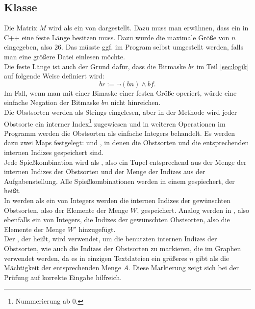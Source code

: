 \subsection{Klasse }
Die Matrix $M$ wird als ein  von  dargestellt.
Dazu muss man erwähnen, dass ein  in C++ eine feste Länge besitzen muss.
Dazu wurde die maximale Größe von $n$ eingegeben, also 26.
Das müsste ggf. im Program selbst umgestellt werden,
falls man eine größere Datei einlesen möchte.\\
Die feste Länge ist auch der Grund dafür, dass die Bitmaske $br$ im Teil \ref{sec:logik}
auf folgende Weise definiert wird:
\[
br := \neg(bn) \land bf.
\]
Im Fall, wenn man mit einer Bimaske einer festen Größe operiert, würde 
eine einfache Negation der Bitmaske $bn$ nicht hinreichen.\\

Die Obstsorten werden als Strings eingelesen, aber in der Methode 
wird jeder Obstsorte ein interner Index\footnote{Nummerierung ab 0.} zugewiesen
und in weiteren Operationen im Programm
werden die Obstsorten als einfache Integers behandelt. 
Es werden dazu zwei Maps festgelegt:  und , 
in denen die Obstsorten und die entsprechenden internen Indizes gespeichert sind.\\

Jede Spießkombination wird als , also ein Tupel entsprechend
aus der Menge der internen Indizes der Obstsorten und der Menge der Indizes aus der Aufgabenstellung.
Alle Spießkombinationen werden in einem  gespiechert, der  heißt.\\

In  werden als ein  von Integers werden die internen Indizes der gewünschten 
Obstsorten, also der Elemente der Menge $W$, gespeichert.
Analog werden in , also ebenfalls ein  von Integers, die Indizes der gewünschten 
Obstsorten, also die Elemente der Menge $W'$ hinzugefügt.\\ 

Der , der  heißt, wird verwendet, um die benutzten internen Indizes der Obstsorten,
wie auch die Indizes der Obstsorten zu markieren, die im Graphen verwendet werden,
da es in einzigen Textdateien ein größeres $n$ gibt als die Mächtigkeit der entsprechenden Menge $A$. 
Diese Markierung zeigt sich bei der Prüfung auf korrekte Eingabe hilfreich.\\

